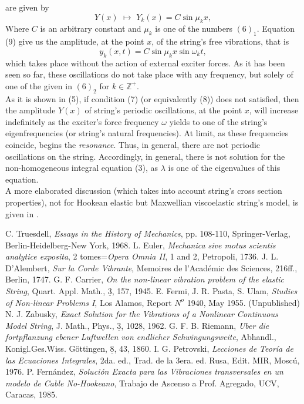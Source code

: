 \documentclass[12pt]{article}
\begin{document}
are given by
\begin{equation}
Y(x)\,\, \mapsto \,\, Y_k(x)=C\sin\mu_kx,
\end{equation}
Where $C$ is an arbitrary constant and $\mu_k$ is one of the numbers $(6)_1$. Equation (9) give us the amplitude, at the point $x$, of the string's free vibrations, that is
\begin{equation}
y_k(x,t)=C\sin\mu_kx\sin\omega_kt,
\end{equation}
which takes place without the action of external exciter forces. As it has been seen so far, these oscillations do not take place with any frequency, but solely of one of the given in $(6)_2$ for $k\in\mathbb{Z}^+$. \\
As it is shown in (5), if condition (7) (or equivalently (8)) does not satisfied, then the amplitude $Y(x)$ of string's periodic oscillations, at the point $x$, will increase indefinitely as the exciter's force frequency $\omega$ yields to  one of the string's eigenfrequencies (or string's natural frequencies). At limit, as these frequencies coincide, begins the \emph{resonance}. Thus, in general, there are not periodic oscillations on the string. Accordingly, in general, there is not solution for the non-homogeneous integral equation (3), as $\lambda$ is one of the eigenvalues of this equation. \\
A more elaborated discussion (which takes into account string's cross section properties), not for Hookean elastic but Maxwellian viscoelastic string's model, is given in \cite{cite:perucho}.

\begin{thebibliography}{1}
C. Truesdell, {\em Essays in the History of Mechanics}, pp. 108-110, Springer-Verlag, Berlin-Heidelberg-New York, 1968.
L. Euler, {\em Mechanica sive motus scientis analytice exposita}, 2 tomes={\em Opera Omnia II}, 1 and 2, Petropoli, 1736.
J. L. {\small{D}}'Alembert, {\em Sur la Corde Vibrante}, Memoires de l'Acad\'emic des Sciences, 216ff., Berlin, 1747.
G. F. Carrier, {\em On the non-linear vibration problem of the elastic String}, Quart. Appl. Math., $\underline{3}$, 157, 1945.
E. Fermi, J. R. Pasta, S. Ulam, {\em Studies of Non-linear Problems I}, Los Alamos, Report $N^o$ 1940, May 1955. (Unpublished)
N. J. Zabusky, {\em Exact Solution for the Vibrations of a Nonlinear Continuous Model String}, J. Math., Phys., $\underline{3}$, 1028, 1962.
G. F. B. Riemann, {\em Uber die fortpflanzung ebener Luftwellen von endlicher Schwingungsweite}, Abhandl., Konigl.Ges.Wiss. G\"ottingen, $\underline{8}$, 43, 1860.
I. G. Petrovski, {\em Lecciones de Teor\'ia de las Ecuaciones Integrales}, 2da. ed., Trad. de la 3era. ed. Rusa, Edit. MIR, Mosc\'u, 1976.
P. Fern\'andez, {\em Soluci\'on Exacta para las Vibraciones transversales en un modelo de Cable No-Hookeano}, Trabajo de Ascenso a Prof. Agregado, UCV, Caracas, 1985.  
\end{thebibliography}   
   






\end{document}
